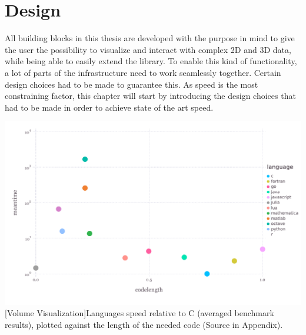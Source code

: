 \section{Design}

All building blocks in this thesis are developed with the purpose in mind to give the user the possibility to visualize and interact with complex 2D and 3D data, while being able to easily extend the library.
To enable this kind of functionality, a lot of parts of the infrastructure need to work seamlessly together.
Certain design choices had to be made to guarantee this. As speed is the most constraining factor, this chapter will start by introducing the design choices that had to be made in order to achieve state of the art speed.

\vspace{1em}
\begin{minipage}{\linewidth}
    \centering
    \includegraphics[width=0.9\linewidth]{graphics/julia_bench.pdf}
    [Volume Visualization]{Languages speed relative to C (averaged benchmark results), plotted against the length of the needed code (Source in Appendix).}
    \label{fig:juliabench}
\end{minipage}

